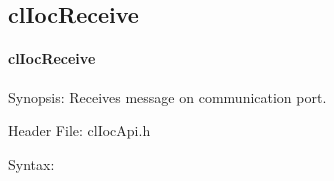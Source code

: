 \begin{flushleft}
\subsection{clIocReceive}
\hypertarget{pageioc105}{}\paragraph{cl\-Ioc\-Receive}\label{pageioc105}
\begin{Desc}
\item[Synopsis:]Receives message on communication port.\end{Desc}
\begin{Desc}
\item[Header File:]clIocApi.h\end{Desc}
\begin{Desc}
\item[Syntax:]


\end{Desc}
\end{flushleft}
